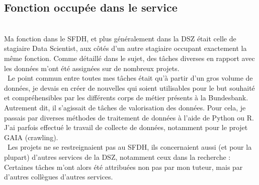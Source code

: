 \pagebreak

\subsection{Fonction occupée dans le service}
~\\
Ma fonction dans le SFDH, et plus généralement dans la DSZ était celle de stagiaire Data Scientist, aux côtés d'un autre stagiaire occupant exactement la même fonction.
Comme détaillé dans le sujet, des tâches diverses en rapport avec les données m'ont été assignées sur de nombreux projets.
\\

~Le point commun entre toutes mes tâches était qu'à partir d'un gros volume de données, je devais en créer de nouvelles qui soient utilisables pour le but souhaité et compréhensibles par les différents corps de métier présents à la Bundesbank.
Autrement dit, il s'agissait de tâches de valorisation des données. Pour cela, je passais par diverses méthodes de traitement de données à l'aide de Python ou R.
J'ai parfois effectué le travail de collecte de données, notamment pour le projet GAIA (crawling).
\\

~Les projets ne se restreignaient pas au SFDH, ils concernaient aussi (et pour la plupart) d'autres services de la DSZ, notamment ceux dans la recherche :
Certaines tâches m'ont alors été attribuées non pas par mon tuteur, mais par d'autres collègues d'autres services.





